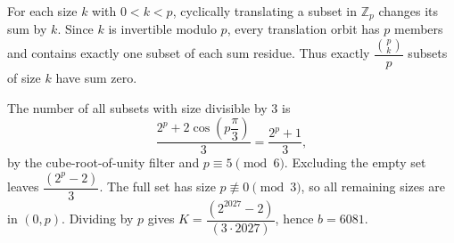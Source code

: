 For each size $k$ with $0<k<p$, cyclically translating a subset in $\mathbb Z_p$ changes its sum by $k$. Since $k$ is invertible modulo $p$, every translation orbit has $p$ members and contains exactly one subset of each sum residue. Thus exactly $\dfrac{\binom pk}{p}$ subsets of size $k$ have sum zero.

The number of all subsets with size divisible by $3$ is
\[
\dfrac{2^p+2\cos(p\dfrac{\pi}{3})}{3}=\dfrac{2^p+1}{3},
\]
by the cube-root-of-unity filter and $p\equiv5\pmod6$. Excluding the empty set leaves $\dfrac{(2^p-2)}{3}$. The full set has size $p\not\equiv0\pmod3$, so all remaining sizes are in $(0,p)$. Dividing by $p$ gives $K=\dfrac{(2^{2027}-2)}{(3\cdot2027)}$, hence $\boxed{b=6081}$.
